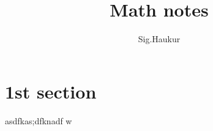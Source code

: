 \documentclass[a4paper, 11pt]{article}
\author{Sig.Haukur}
\title{Math notes}
\begin{document}
\maketitle

\tableofcontents
\section{1st section}
asdfkas;dfknadf w
\end{document}
